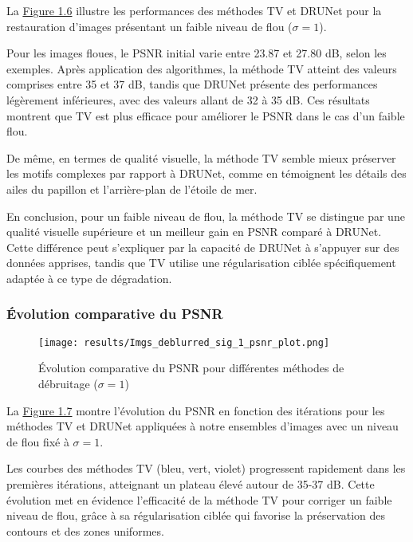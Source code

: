\documentclass[a4paper, 12pt]{report} %
\begin{document}
La \hyperref[fig:6]{Figure 1.6} illustre les performances des méthodes TV et DRUNet pour la restauration d’images présentant un faible niveau de flou (\(\sigma = 1\)). 

Pour les images floues, le PSNR initial varie entre 23.87 et 27.80 dB, selon les exemples. Après application des algorithmes, la méthode TV atteint des valeurs comprises entre 35 et 37 dB, tandis que DRUNet présente des performances légèrement inférieures, avec des valeurs allant de 32 à 35 dB. Ces résultats montrent que TV est plus efficace pour améliorer le PSNR dans le cas d’un faible flou.

De même, en termes de qualité visuelle, la méthode TV semble mieux préserver les motifs complexes par rapport à DRUNet, comme en témoignent les détails des ailes du papillon et l’arrière-plan de l’étoile de mer.

En conclusion, pour un faible niveau de flou, la méthode TV se distingue par une qualité visuelle supérieure et un meilleur gain en PSNR comparé à DRUNet. Cette différence peut s'expliquer par la capacité de DRUNet à s’appuyer sur des données apprises, tandis que TV utilise une régularisation ciblée spécifiquement adaptée à ce type de dégradation.


\subsubsection{Évolution comparative du PSNR}

\begin{figure}[H]
\centering
\begin{adjustbox}{width=0.985\linewidth, totalheight=0.47 \textheight, angle=0, scale= 0.9, minipage= 4.2\linewidth, margin= 0}
    \texttt{[image: results/Imgs\_deblurred\_sig\_1\_psnr\_plot.png]}
\end{adjustbox}
    \caption{Évolution comparative du PSNR pour différentes méthodes de débruitage (\(\sigma = 1\))}
    \label{fig:7}
\end{figure} 

La \hyperref[fig:7]{Figure 1.7} montre l’évolution du PSNR en fonction des itérations pour les méthodes TV et DRUNet appliquées à notre ensembles d’images avec un niveau de flou fixé à \(\sigma = 1\).

Les courbes des méthodes TV (bleu, vert, violet) progressent rapidement dans les premières itérations, atteignant un plateau élevé autour de 35-37 dB. Cette évolution met en évidence l’efficacité de la méthode TV pour corriger un faible niveau de flou, grâce à sa régularisation ciblée qui favorise la préservation des contours et des zones uniformes.
\end{document}
